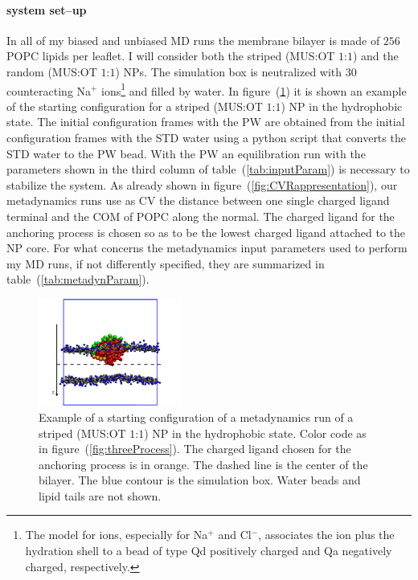 \paragraph{\textbf{system set--up}} In all of my biased and unbiased \ac{MD} runs the membrane bilayer is made of $256$ \ac{POPC} lipids per leaflet. I will consider both the striped (\ac{MUS}:\ac{OT} $1$:$1$) and the random (\ac{MUS}:\ac{OT} $1$:$1$) \acp{NP}. The simulation box is neutralized with $30$ counteracting Na$^+$ ions\footnote{The \martini model for ions, especially for Na$^+$ and Cl$^-$, associates the ion plus the hydration shell to a bead of type Qd positively charged and Qa negatively charged, respectively.} and filled by water. In figure~(\ref{fig:startFrameHydro}) it is shown an example of the starting configuration for a striped (\ac{MUS}:\ac{OT} $1$:$1$) \ac{NP} in the hydrophobic state. The initial configuration frames with the \ac{PW} are obtained from the initial configuration frames with the \ac{STD} \martini water using a python script that converts the \ac{STD} \martini water to the \ac{PW} bead. With the \ac{PW} an equilibration run with the parameters shown in the third column of table~(\ref{tab:inputParam}) is necessary to stabilize the system. As already shown in figure~(\ref{fig:CVRappresentation}), our metadynamics runs use as \ac{CV} the distance between one single charged ligand terminal and the \ac{COM} of \ac{POPC} along the normal. The charged ligand for the anchoring process is chosen so as to be the lowest charged ligand attached to the \ac{NP} core. For what concerns the metadynamics input parameters used to perform my \ac{MD} runs, if not differently specified, they are summarized in table~(\ref{tab:metadynParam}).
\begin{figure}
	\centering
	\includegraphics[width=0.42\textwidth]{./img/patchedHydrophobic.pdf}
	\caption{Example of a starting configuration of a metadynamics run of a striped (\ac{MUS}:\ac{OT} $1$:$1$) \ac{NP} in the hydrophobic state. Color code as in figure~(\ref{fig:threeProcess}). The charged ligand chosen for the anchoring process is in orange. The dashed line is the center of the bilayer. The blue contour is the simulation box. Water beads and lipid tails are not shown.}%
	\label{fig:startFrameHydro}
\end{figure}

